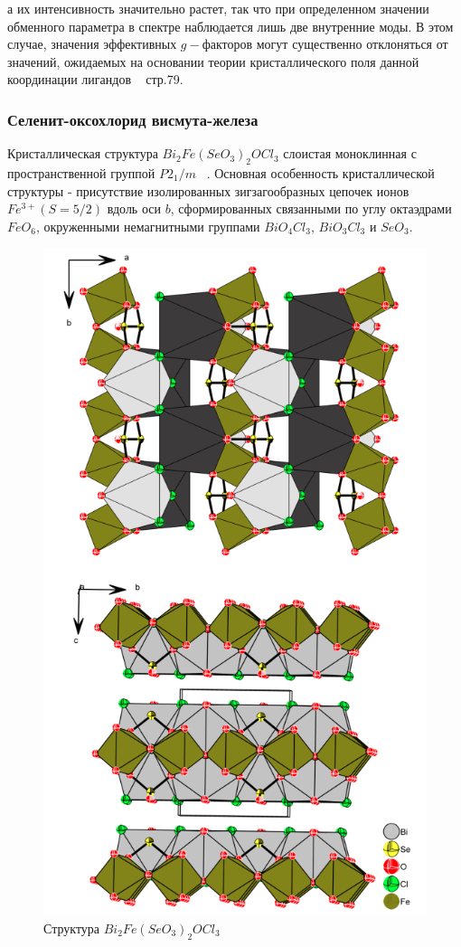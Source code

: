 \documentclass[11pt]{article}
\begin{document}
а их интенсивность значительно растет, так что при определенном значении обменного параметра в спектре наблюдается лишь две внутренние моды. В этом случае, значения эффективных $g-$факторов могут существенно отклоняться от значений, ожидаемых на основании теории кристаллического поля данной координации лигандов ~\cite{nm} стр.79.

\subsubsection{Селенит-оксохлорид висмута-железа}
Кристаллическая структура $Bi_2Fe(SeO_3)_2OCl_3$ слоистая моноклинная с пространственной группой $P2_1/m$ ~\cite{berdonosov2014}. Основная особенность кристаллической структуры - присутствие изолированных зигзагообразных цепочек ионов $Fe^{3+} (S=5/2)$ вдоль оси $b$, сформированных связанными по углу октаэдрами $FeO_6$, окруженными немагнитными группами $BiO_4Cl_3$, $BiO_3Cl_3$ и $SeO_3$.

\begin{figure}[htp]
\centering
\includegraphics[scale=0.7]{Bi2FeSeO32OCl3}
\caption {Структура $Bi_2Fe(SeO_3)_2OCl_3$  ~\cite{berdonosov2014}}
\label{}
\end{figure}
\end{document}
